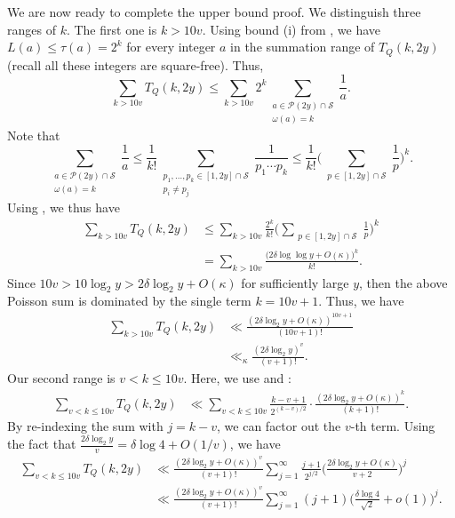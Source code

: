 \documentclass{amsart}
\theoremstyle{definition}
\numberwithin{equation}{section}
\renewcommand{\S}{\mathcal{S}}
\newcommand{\density}{\delta}
\begin{document}
			
		We are now ready to complete the upper bound proof. We distinguish three ranges of $k$. The first one is $k > 10v$. Using bound (i) from , we have $L(a)\le \tau(a)=2^k$ for every integer $a$ in the summation range of $T_Q(k,2y)$ (recall all these integers are square-free). Thus,
		\begin{equation*}
			\sum_{k > 10v} T_Q(k,2y) \le \sum_{k > 10v}  2^k \sum_{\substack{a \in \mathscr{P}(2y) \cap \S \\ \omega(a) = k}} \frac{1}{a}.
		\end{equation*}
		Note that 
		$$\sum_{\substack{a \in \mathscr{P}(2y) \cap \S \\ \omega(a) = k}} \frac{1}{a} \le \frac{1}{k!}\sum_{\substack{p_1,\dots,p_k \in [1,2y] \cap \S\\ p_i \ne p_j }} \frac{1}{p_1 \cdots p_k} \leq \frac{1}{k!}\bigg(\sum_{\substack{p\in [1,2y] \cap \S}} \frac{1}{p}\bigg)^k.$$
		Using , we thus have
		\begin{align*}
			\sum_{k > 10v} T_Q(k,2y) &\le \sum_{k > 10v}  \frac{2^k }{k!}\bigg(\sum_{\substack{p\in [1,2y] \cap \S}} \frac{1}{p}\bigg)^k\\
			&= \sum_{k > 10v}  \frac{\big( 2\delta \log \log y + O(\kappa)\big)^k}{k!}.
		\end{align*}
	Since $10v > 10 \log_2 y > 2\density \log_2 y + O(\kappa)$ for sufficiently large $y$, then the above Poisson sum is dominated by the single term $k = 10v+1$. Thus, we have
	\begin{align*}
		\sum_{k > 10v} T_Q(k,2y) &\ll \frac{\left(2\density \log_2 y +O(\kappa) \right)^{10v+1}}{(10v+1)!}\\
		&\ll_\kappa \frac{\left(2\density \log_2 y\right)^{v}}{(v+1)!}.
	\end{align*}
	Our second range is $v < k \leq 10v$. Here, we use  and :
	\begin{align*}
		\sum_{v < k \leq 10v} T_Q(k,2y) &\ll \sum_{v < k \leq 10v} \frac{k-v+1}{2^{(k-v)/2}}\cdot\frac{(2\density \log_2y + O(\kappa))^k}{(k+1)!}.
	\end{align*}
	By re-indexing the sum with $j = k-v$, we can factor out the $v$-th term. Using the fact that $\frac{2\density \log_2 y}{v} = \density \log 4 + O(1/v)$, we have
	\begin{align*}
		\sum_{v < k \leq 10v} T_Q(k,2y) &\ll \frac{(2\density \log_2y + O(\kappa))^v}{(v+1)!} \sum_{j=1}^{\infty} \frac{j+1}{2^{j/2}} \bigg( \frac{2\density \log_2 y + O(\kappa)}{v+2} \bigg)^j\\
		&\ll \frac{(2\density \log_2y + O(\kappa))^v}{(v+1)!} \sum_{j=1}^{\infty} (j+1) \bigg( \frac{\density \log 4}{\sqrt{2}} + o(1) \bigg)^j.
	\end{align*}
\end{document}
